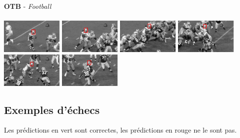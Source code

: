 \documentclass[10pt,twocolumn,letterpaper,french]{article}
\begin{document}
\begin{appendices}
\begin{center}
  \textbf{OTB} - \textit{Football}\\
  \hspace{1cm}\\
  \includegraphics[width=85pt]{images/exemples/ok/foot/000001.png}
  \includegraphics[width=85pt]{images/exemples/ok/foot/000052.png}
  \includegraphics[width=85pt]{images/exemples/ok/foot/000103.png}
  \includegraphics[width=85pt]{images/exemples/ok/foot/000165.png}
  \includegraphics[width=85pt]{images/exemples/ok/foot/000263.png}
  \includegraphics[width=85pt]{images/exemples/ok/foot/000360.png}\\

  \end{center}
  \clearpage
  \subsection*{Exemples d'échecs}
  Les prédictions en vert sont correctes, les prédictions en rouge ne le sont pas.
  \begin{center}
    \hspace{1cm}


\end{center}
\end{appendices}
\end{document}
